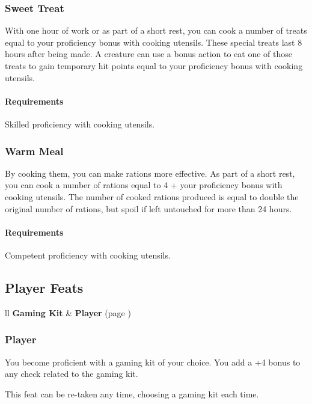     \subsubsection{Sweet Treat} \label{feat::sweettreat}
        With one hour of work or as part of a short rest, you can cook a number of treats equal to your proficiency bonus with cooking utensils.
        These special treats last 8 hours after being made.
        A creature can use a bonus action to eat one of those treats to gain temporary hit points equal to your proficiency bonus with cooking utensils.
        \paragraph{Requirements} Skilled proficiency with cooking utensils.
    \subsubsection{Warm Meal} \label{feat::warmmeal}
        By cooking them, you can make rations more effective.
        As part of a short rest, you can cook a number of rations equal to 4 + your proficiency bonus with cooking utensils.
        The number of cooked rations produced is equal to double the original number of rations, but spoil if left untouched for more than 24 hours.
        \paragraph{Requirements} Competent proficiency with cooking utensils.
\subsection*{Player Feats}
    \begin{DndTable}[width=\linewidth, header=Player Feats]{ll}
        \textbf{Gaming Kit} & \textbf{Player} (page \pageref{feat::player})
    \end{DndTable}

    \subsubsection{Player} \label{feat::player}
        You become proficient with a gaming kit of your choice.
        You add a +4 bonus to any check related to the gaming kit.

        This feat can be re-taken any time, choosing a gaming kit each time.
